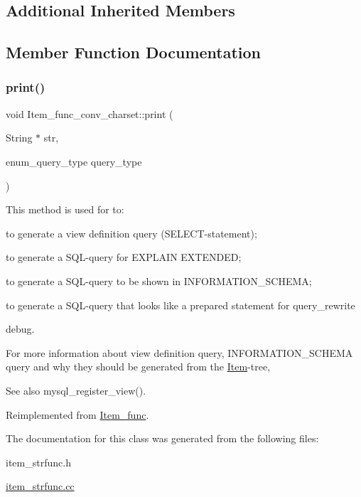 \subsection*{Additional Inherited Members}


\subsection{Member Function Documentation}
\mbox{\label{classItem__func__conv__charset_ac8281c66d90d6a9b818dde781f63d28f}} 
\subsubsection{\texorpdfstring{print()}{print()}}
{\footnotesize\ttfamily void Item\+\_\+func\+\_\+conv\+\_\+charset\+::print (\begin{DoxyParamCaption}\item[{String $\ast$}]{str,  }\item[{enum\+\_\+query\+\_\+type}]{query\+\_\+type }\end{DoxyParamCaption})\hspace{0.3cm}{\ttfamily [virtual]}}

This method is used for to\+:
\begin{DoxyItemize}
\item to generate a view definition query (S\+E\+L\+E\+CT-\/statement);
\item to generate a S\+QL-\/query for E\+X\+P\+L\+A\+IN E\+X\+T\+E\+N\+D\+ED;
\item to generate a S\+QL-\/query to be shown in I\+N\+F\+O\+R\+M\+A\+T\+I\+O\+N\+\_\+\+S\+C\+H\+E\+MA;
\item to generate a S\+QL-\/query that looks like a prepared statement for query\+\_\+rewrite
\item debug.
\end{DoxyItemize}

For more information about view definition query, I\+N\+F\+O\+R\+M\+A\+T\+I\+O\+N\+\_\+\+S\+C\+H\+E\+MA query and why they should be generated from the \mbox{\hyperlink{classItem}{Item}}-\/tree, \begin{DoxySeeAlso}{See also}
mysql\+\_\+register\+\_\+view(). 
\end{DoxySeeAlso}


Reimplemented from \mbox{\hyperlink{classItem__func_afb302ee25d4721ace27d3f5053d4ee41}{Item\+\_\+func}}.



The documentation for this class was generated from the following files\+:\begin{DoxyCompactItemize}
\item 
item\+\_\+strfunc.\+h\item 
\mbox{\hyperlink{item__strfunc_8cc}{item\+\_\+strfunc.\+cc}}\end{DoxyCompactItemize}
